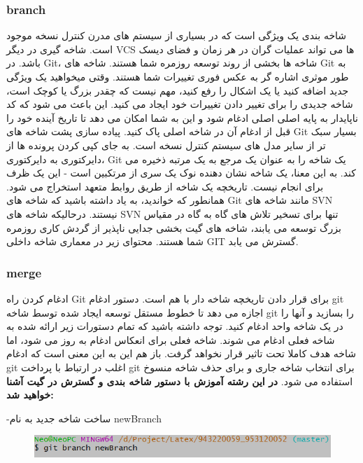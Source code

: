 \subsubsection{branch}
شاخه بندی یک ویژگی است که در بسیاری از سیستم های مدرن کنترل نسخه موجود است. شاخه گیری در دیگر VCS ها می تواند عملیات گران در هر زمان و فضای دیسک باشد. در Git، شاخه ها بخشی از روند توسعه روزمره شما هستند. شاخه های Git به طور موثری اشاره گر به عکس فوری تغییرات شما هستند. وقتی میخواهید یک ویژگی جدید اضافه کنید یا یک اشکال را رفع کنید، مهم نیست که چقدر بزرگ یا کوچک است، شاخه جدیدی را برای تغییر دادن تغییرات خود ایجاد می کنید. این باعث می شود که کد ناپایدار به پایه اصلی اصلی ادغام شود و این به شما امکان می دهد تا تاریخ آینده خود را قبل از ادغام آن در شاخه اصلی پاک کنید.
\newline
پیاده سازی پشت شاخه های Git بسیار سبک تر از سایر مدل های سیستم کنترل نسخه است. به جای کپی کردن پرونده ها از دایرکتوری به دایرکتوری، Git یک شاخه را به عنوان یک مرجع به یک مرتبه ذخیره می کند. به این معنا، یک شاخه نشان دهنده نوک یک سری از مرتکبین است - این یک ظرف برای انجام نیست. تاریخچه یک شاخه از طریق روابط متعهد استخراج می شود.
\newline
همانطور که خواندید، به یاد داشته باشید که شاخه های Git مانند شاخه های SVN نیستند. درحالیکه شاخه های SVN تنها برای تسخیر تلاش های گاه به گاه در مقیاس بزرگ توسعه می یابند، شاخه های گیت بخشی جدایی ناپذیر از گردش کاری روزمره شما هستند. محتوای زیر در معماری شاخه داخلی GIT گسترش می یابد.
\subsubsection{merge}
ادغام کردن راه Git برای قرار دادن تاریخچه شاخه دار با هم است. دستور ادغام git اجازه می دهد تا خطوط مستقل توسعه ایجاد شده توسط شاخه git را بسازید و آنها را در یک شاخه واحد ادغام کنید.
\newline
توجه داشته باشید که تمام دستورات زیر ارائه شده به شاخه فعلی ادغام می شوند. شاخه فعلی برای انعکاس ادغام به روز می شود، اما شاخه هدف کاملا تحت تاثیر قرار نخواهد گرفت. باز هم این به این معنی است که ادغام git اغلب در ارتباط با پرداخت git برای انتخاب شاخه جاری و  برای حذف شاخه منسوخ استفاده می شود.
\newline  \newline \newline
\textbf{در این رشته آموزش با دستور شاخه بندی و گسترش در گیت آشنا خواهید شد:}
\newline
\newline

-ساخت شاخه جدید به نام newBranch
\begin{figure}[tbh]
	\centering
	\includegraphics[width=1\textwidth]{./Figures/n1}
	\caption{  }
	\label{n1}
\end{figure}



